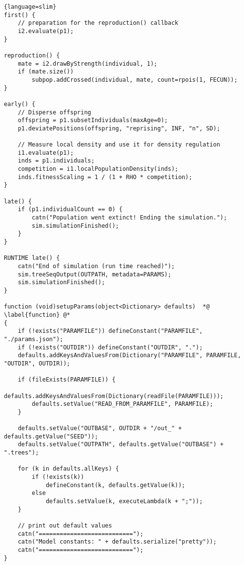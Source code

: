\documentclass{article}
\begin{document}
\begin{lstlisting}{language=slim}
first() {
	// preparation for the reproduction() callback
	i2.evaluate(p1);
}

reproduction() {
	mate = i2.drawByStrength(individual, 1);
	if (mate.size())
		subpop.addCrossed(individual, mate, count=rpois(1, FECUN));
}

early() {
	// Disperse offspring
	offspring = p1.subsetIndividuals(maxAge=0);
	p1.deviatePositions(offspring, "reprising", INF, "n", SD);
		
	// Measure local density and use it for density regulation
	i1.evaluate(p1);
	inds = p1.individuals;
	competition = i1.localPopulationDensity(inds);
	inds.fitnessScaling = 1 / (1 + RHO * competition);
}

late() {
	if (p1.individualCount == 0) {
		catn("Population went extinct! Ending the simulation.");
		sim.simulationFinished();
	}
}

RUNTIME late() {
	catn("End of simulation (run time reached)");
	sim.treeSeqOutput(OUTPATH, metadata=PARAMS);
	sim.simulationFinished();
}

function (void)setupParams(object<Dictionary> defaults)  *@ \label{function} @*
{
	if (!exists("PARAMFILE")) defineConstant("PARAMFILE", "./params.json");
	if (!exists("OUTDIR")) defineConstant("OUTDIR", ".");
	defaults.addKeysAndValuesFrom(Dictionary("PARAMFILE", PARAMFILE, "OUTDIR", OUTDIR));
	
	if (fileExists(PARAMFILE)) {
		defaults.addKeysAndValuesFrom(Dictionary(readFile(PARAMFILE)));
		defaults.setValue("READ_FROM_PARAMFILE", PARAMFILE);
	}
	
	defaults.setValue("OUTBASE", OUTDIR + "/out_" +	defaults.getValue("SEED"));
	defaults.setValue("OUTPATH", defaults.getValue("OUTBASE") + ".trees");
	
	for (k in defaults.allKeys) {
		if (!exists(k))
			defineConstant(k, defaults.getValue(k));
		else
			defaults.setValue(k, executeLambda(k + ";"));
	}
	
	// print out default values
	catn("===========================");
	catn("Model constants: " + defaults.serialize("pretty"));
	catn("===========================");
}
\end{lstlisting}
\end{document}
